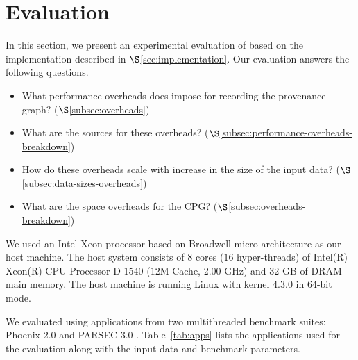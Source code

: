 
\section{Evaluation}
\label{sec:evaluation}
In this section, we present an experimental evaluation of \projecttitle based on the implementation described in  $\S$\ref{sec:implementation}. 
Our evaluation answers the following questions.



\begin{itemize}
\item What performance overheads does \projecttitle impose for recording the provenance graph? ($\S$\ref{subsec:overheads})
\item What are the sources for these overheads? ($\S$\ref{subsec:performance-overheads-breakdown})
\item How do these overheads scale with increase in the size of the input data? ($\S$\ref{subsec:data-sizes-overheads})
\item What are the space overheads for the CPG? ($\S$\ref{subsec:overheads-breakdown})
\end{itemize}




 We used an Intel Xeon processor based on Broadwell micro-architecture
as our host machine. The
host system consists of $8$ cores ($16$ hyper-threads) of Intel(R) Xeon(R) CPU Processor D-$1540$
($12$M Cache, $2.00$ GHz) and $32$ GB of DRAM main memory. The host
machine is running Linux with kernel $4.3.0$ in $64$-bit mode. 



  We evaluated \projecttitle using applications from two multithreaded benchmark suites: Phoenix 2.0 \cite{phoenix} and PARSEC 3.0 \cite{parsec}. Table~\ref{tab:apps} lists the applications used for the evaluation along with the input data and benchmark parameters.
%


